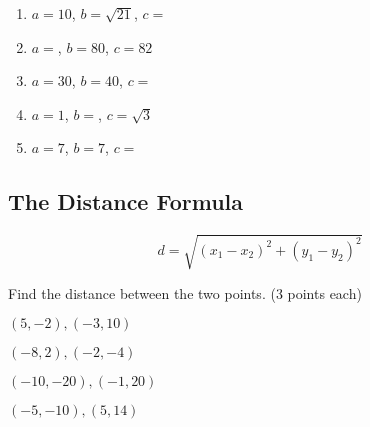 \documentclass[12pt]{article}
\begin{document}
\begin{enumerate}
	\item $a=10$, \hspace{1in} $b=\sqrt{21}$,\hspace{1in} $c=$\underline{\hspace{1in}}\\
	
	\item $a=$\underline{\hspace{1in}}, \hspace{.5cm} $b=80$,\hspace{1in} $c=82$\\
	
	\item $a=30$, \hspace{1in}$b=40$, \hspace{1in}$c=$\underline{\hspace{1in}}\\
	
	\item $a=1$, \hspace{1in}$b=$\underline{\hspace{1in}},\hspace{.5cm} $c=\sqrt{3}$\\
	
	\item $a=7$,\hspace{1in} $b=7$,\hspace{1in} $c=$\underline{\hspace{1in}}
\end{enumerate}


\hrulefill

\subsection*{The Distance Formula}

$$d=\sqrt{(x_{1}-x_{2})^{2}+(y_{1}-y_{2})^{2}}$$

Find the distance between the two points. (3 points each)\\

\begin{enumerate}[resume]
\begin{multicols}{2}
	
	\item $(5,-2),(-3,10)$\\
	
	\item $(-8,2),(-2,-4)$\\
	
	\item $(-10,-20),(-1,20)$\\
	
	\item $(-5,-10), (5,14)$\\


\end{multicols}
\end{enumerate}
\end{document}
